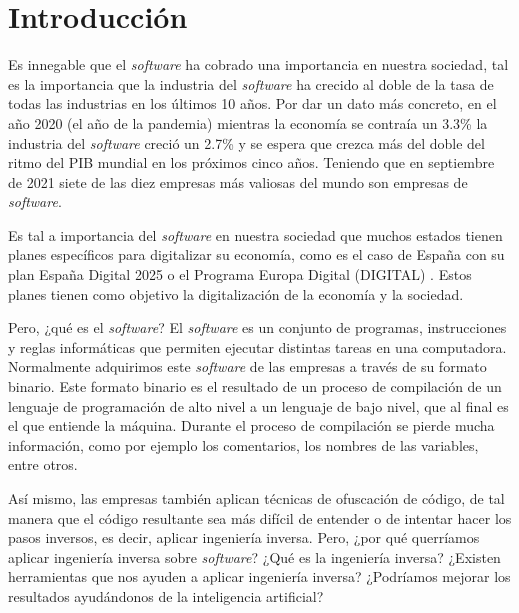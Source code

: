 \chapter{Introducción}
\label{cap:introducion}

\setcounter{page}{1}


Es innegable que el \textit{software} ha cobrado una importancia en nuestra sociedad, tal es
la importancia que la industria del \textit{software} ha crecido al doble de la tasa de todas
las industrias en los últimos 10 años. Por dar un dato más concreto, en el año 2020
(el año de la pandemia) mientras la economía se contraía un 3.3\% la industria del
\textit{software} creció un 2.7\% y se espera que crezca más del doble del ritmo del PIB
mundial en los próximos cinco años. Teniendo que en septiembre de 2021 siete de las
diez empresas más valiosas del mundo son empresas de \textit{software}. \cite{IndustriaSoftware}

Es tal a importancia del \textit{software} en nuestra sociedad que muchos estados tienen planes
específicos para digitalizar su economía, como es el caso de España con su plan
España Digital 2025 o el Programa Europa Digital (DIGITAL) \cite{EspañaDigital2025}
\cite{ProgramaEuropaDigital}. Estos planes tienen como objetivo la digitalización
de la economía y la sociedad.

Pero, ¿qué es el \textit{software}? El \textit{software} es un conjunto de programas, instrucciones
y reglas informáticas que permiten ejecutar distintas tareas en una computadora.
\cite{Software} Normalmente adquirimos este \textit{software} de las empresas a través de
su formato binario. Este formato binario es el resultado de un proceso de compilación
de un lenguaje de programación de alto nivel a un lenguaje de bajo nivel, que al final
es el que entiende la máquina. Durante el proceso de compilación se pierde mucha
información, como por ejemplo los comentarios, los nombres de las variables, entre
otros.

Así mismo, las empresas también aplican técnicas de ofuscación de código, de tal
manera que el código resultante sea más difícil de entender o de intentar hacer los
pasos inversos, es decir, aplicar ingeniería inversa. Pero, ¿por qué querríamos
aplicar ingeniería inversa sobre \textit{software}? ¿Qué es la ingeniería inversa? ¿Existen
herramientas que nos ayuden a aplicar ingeniería inversa? ¿Podríamos mejorar los
resultados ayudándonos de la inteligencia artificial?

